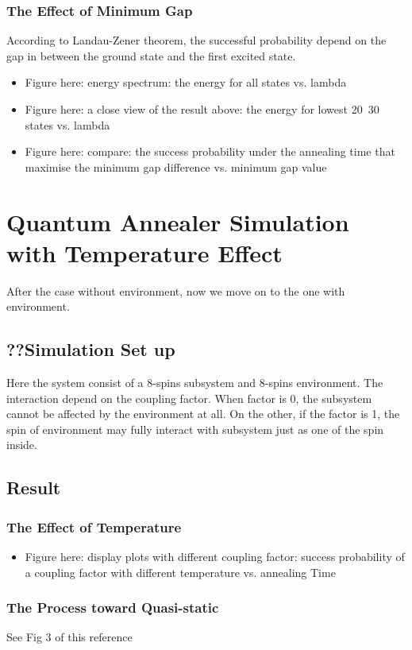 \documentclass[twoside,a4paper,article]{combine}
\begin{document}
\subsubsection{The Effect of Minimum Gap}
	According to Landau-Zener theorem, the successful probability depend on the gap in between the ground state and the first excited state.
	\begin{itemize}
		\item \checkmark Figure here: energy spectrum: the energy for all states vs. lambda
		\item \checkmark Figure here: a close view of the result above: the energy for lowest 20~30 states vs. lambda
		\item \checkmark Figure here: compare: the success probability under the annealing time that maximise the minimum gap difference vs. minimum gap value 
	\end{itemize}
	
\section{Quantum Annealer Simulation with Temperature Effect}
	After the case without environment, now we move on to the one with environment.
\subsection{??Simulation Set up}
	Here the system consist of a 8-spins subsystem and 8-spins environment. The interaction depend on the coupling factor. When factor is 0, the subsystem cannot be affected by the environment at all. On the other, if the factor is 1, the spin of environment may fully interact with subsystem just as one of the spin inside.

\subsection{Result}
\subsubsection{The Effect of Temperature}
	\begin{itemize}
		\item Figure here: display plots with different coupling factor: success probability of a coupling factor with different temperature vs. annealing Time
	\end{itemize}
\subsubsection{The Process toward Quasi-static}
	See Fig 3 of this reference	\cite{Amin2015} 
	
\end{document}
